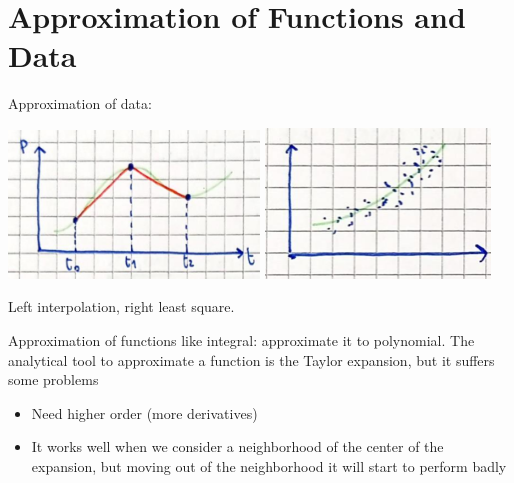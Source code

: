 
\section{Approximation of Functions and Data}
    Approximation of data:
    \begin{center}
        \includegraphics[width=0.5\textwidth]{images/intro_interpolation.png}
        \includegraphics[width=0.45\textwidth]{images/intro_leastsquare.png}
    \end{center}
    Left interpolation, right least square.

    Approximation of functions like integral: approximate it to polynomial. The analytical tool to approximate a function is the Taylor expansion, but it suffers some problems
    \begin{itemize}
        \item Need higher order (more derivatives)
        \item It works well when we consider a neighborhood of the center of the expansion, but moving out of the neighborhood it will start to perform badly
    \end{itemize}

